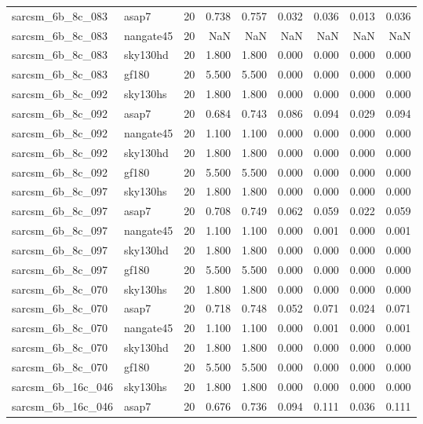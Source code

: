 \begin{tabular}{llrrrrrrr}
sarcsm\_6b\_8c\_083 & asap7 & 20 & 0.738 & 0.757 & 0.032 & 0.036 & 0.013 & 0.036 \\
sarcsm\_6b\_8c\_083 & nangate45 & 20 & NaN & NaN & NaN & NaN & NaN & NaN \\
sarcsm\_6b\_8c\_083 & sky130hd & 20 & 1.800 & 1.800 & 0.000 & 0.000 & 0.000 & 0.000 \\
sarcsm\_6b\_8c\_083 & gf180 & 20 & 5.500 & 5.500 & 0.000 & 0.000 & 0.000 & 0.000 \\
sarcsm\_6b\_8c\_092 & sky130hs & 20 & 1.800 & 1.800 & 0.000 & 0.000 & 0.000 & 0.000 \\
sarcsm\_6b\_8c\_092 & asap7 & 20 & 0.684 & 0.743 & 0.086 & 0.094 & 0.029 & 0.094 \\
sarcsm\_6b\_8c\_092 & nangate45 & 20 & 1.100 & 1.100 & 0.000 & 0.000 & 0.000 & 0.000 \\
sarcsm\_6b\_8c\_092 & sky130hd & 20 & 1.800 & 1.800 & 0.000 & 0.000 & 0.000 & 0.000 \\
sarcsm\_6b\_8c\_092 & gf180 & 20 & 5.500 & 5.500 & 0.000 & 0.000 & 0.000 & 0.000 \\
sarcsm\_6b\_8c\_097 & sky130hs & 20 & 1.800 & 1.800 & 0.000 & 0.000 & 0.000 & 0.000 \\
sarcsm\_6b\_8c\_097 & asap7 & 20 & 0.708 & 0.749 & 0.062 & 0.059 & 0.022 & 0.059 \\
sarcsm\_6b\_8c\_097 & nangate45 & 20 & 1.100 & 1.100 & 0.000 & 0.001 & 0.000 & 0.001 \\
sarcsm\_6b\_8c\_097 & sky130hd & 20 & 1.800 & 1.800 & 0.000 & 0.000 & 0.000 & 0.000 \\
sarcsm\_6b\_8c\_097 & gf180 & 20 & 5.500 & 5.500 & 0.000 & 0.000 & 0.000 & 0.000 \\
sarcsm\_6b\_8c\_070 & sky130hs & 20 & 1.800 & 1.800 & 0.000 & 0.000 & 0.000 & 0.000 \\
sarcsm\_6b\_8c\_070 & asap7 & 20 & 0.718 & 0.748 & 0.052 & 0.071 & 0.024 & 0.071 \\
sarcsm\_6b\_8c\_070 & nangate45 & 20 & 1.100 & 1.100 & 0.000 & 0.001 & 0.000 & 0.001 \\
sarcsm\_6b\_8c\_070 & sky130hd & 20 & 1.800 & 1.800 & 0.000 & 0.000 & 0.000 & 0.000 \\
sarcsm\_6b\_8c\_070 & gf180 & 20 & 5.500 & 5.500 & 0.000 & 0.000 & 0.000 & 0.000 \\
sarcsm\_6b\_16c\_046 & sky130hs & 20 & 1.800 & 1.800 & 0.000 & 0.000 & 0.000 & 0.000 \\
sarcsm\_6b\_16c\_046 & asap7 & 20 & 0.676 & 0.736 & 0.094 & 0.111 & 0.036 & 0.111 \\

\end{tabular}
